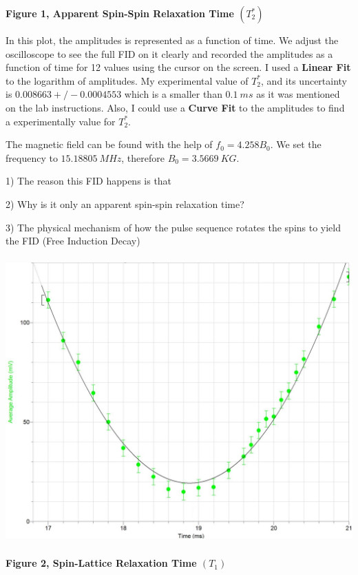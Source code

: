 \documentclass[fleqn]{article}
\begin{document}
  \textbf{Figure 1, Apparent Spin-Spin Relaxation Time $(T_2^*)$}

  \vspace{10px}

  In this plot, the amplitudes is represented as a function of time. We adjust the oscilloscope to see 
  the full FID on it clearly and recorded the amplitudes as a function of time for 12 values using the cursor on the 
  screen. I used a \textbf{Linear Fit} to the logarithm of amplitudes. My experimental value of $T_2^*$, and its uncertainty 
  is $0.008663 +/- 0.0004553$ which is a smaller than $0.1 ~ ms$ as it was mentioned on the lab instructions. Also, I could use a 
  \textbf{Curve Fit} to the amplitudes to find a experimentally value for $T_2^*$.

  \vspace{10px}

  The magnetic field can be found with the help of $f_0=4.258 B_0$. We set the frequency to $15.18805 ~ MHz$, 
  therefore $B_0=3.5669 ~ KG$.  

  1) The reason this FID happens is that

  2) Why is it only an apparent spin-spin relaxation time?

  3) The physical mechanism of how the pulse sequence rotates the spins to yield the FID (Free Induction Decay)

  \pagebreak

  \includegraphics[height=11cm, width=16cm]{Fig2.JPG}

  \textbf{Figure 2, Spin-Lattice Relaxation Time $(T_1)$}
\end{document}
